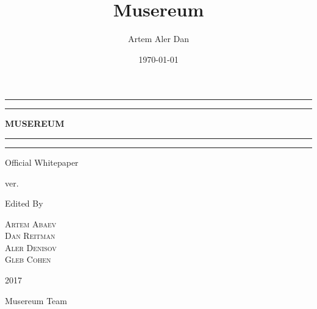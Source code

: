 \documentclass[12pt]{report}
\title{Musereum}
\author{Artem Aler Dan}
\date{\today}
\begin{document}
\begin{titlepage}
	\centering
	
	\scshape %
	\vspace*{\baselineskip} %
	
	\rule{\textwidth}{1.6pt}\vspace*{-\baselineskip}\vspace*{2pt} %
	\rule{\textwidth}{0.4pt} %
	
	\vspace{0.75\baselineskip} %
	
	{\Huge\textbf{MUSEREUM}} %
	
	\rule{\textwidth}{0.4pt}\vspace*{-\baselineskip}\vspace{3.2pt} %
	\rule{\textwidth}{1.6pt} %
	
	\vspace{1.5\baselineskip} %
	
	
	Official Whitepaper %
	
	\small{ver.\VERSION}
	
	\vspace*{3.5\baselineskip} %
	
	
	
	Edited By
	
	\vspace{0.5\baselineskip} %
	
	{\scshape\Large Artem Abaev \\ Dan Reitman \\ Aler Denisov \\ Gleb Cohen \\} %
	
	
	
	\vfill %
	
		
	\vspace{0.3\baselineskip} %
	
	2017 %
	
	{\large Musereum Team} %

\end{titlepage}
\end{document}

